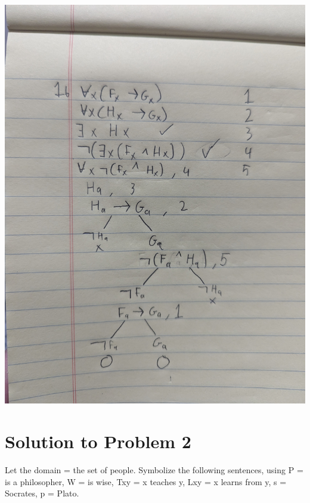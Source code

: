 \documentclass[12pt]{article}
\begin{document}
\includegraphics[width=\textwidth]{1b}

\section*{Solution to Problem 2}

Let the domain = the set of people. Symbolize the following sentences, using P = is a philosopher, W = is wise, Txy = x teaches y, Lxy = x learns from y, s = Socrates, p = Plato. 
\end{document}
